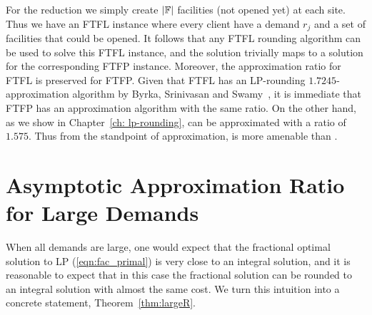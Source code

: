 \documentclass[oneside,final]{ucr}
\begin{document}
For the reduction we simply create $|\mathbb{F}|$ facilities
(not opened yet) at each site. Thus we have an FTFL instance
where every client have a demand $r_j$ and a set of
facilities that could be opened. It follows that any FTFL
rounding algorithm can be used to solve this FTFL instance,
and the solution trivially maps to a solution for the
corresponding FTFP instance. Moreover, the approximation
ratio for FTFL is preserved for FTFP. Given that FTFL has an
LP-rounding $1.7245$-approximation algorithm by Byrka,
Srinivasan and Swamy~\cite{ByrkaSS10}, it is immediate that
FTFP has an approximation algorithm with the same ratio. On
the other hand, as we show in Chapter~\ref{ch: lp-rounding},
{\FTFP} can be approximated with a ratio of $1.575$. Thus
from the standpoint of approximation, {\FTFP} is more
amenable than {\FTFL}.

\section{Asymptotic Approximation Ratio for Large
  Demands}
\label{sec: large_demands}
When all demands are large, one would expect that the
fractional optimal solution to LP (\ref{eqn:fac_primal}) is
very close to an integral solution, and it is reasonable to
expect that in this case the fractional solution can be
rounded to an integral solution with almost the same
cost. We turn this intuition into a concrete statement,
Theorem~\ref{thm:largeR}.
\end{document}
